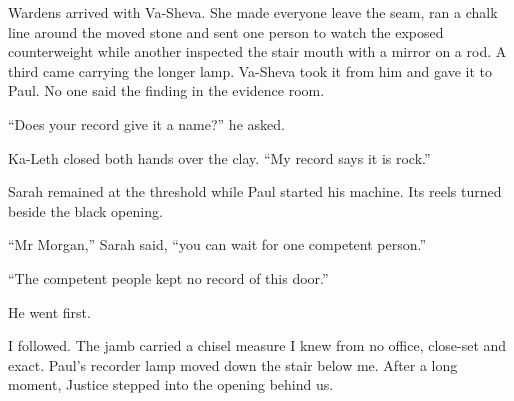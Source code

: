 Wardens arrived with Va-Sheva. She made everyone leave the seam, ran a chalk line around the moved stone and sent one person to watch the exposed counterweight while another inspected the stair mouth with a mirror on a rod. A third came carrying the longer lamp. Va-Sheva took it from him and gave it to Paul. No one said the finding in the evidence room.\par

``Does your record give it a name?'' he asked.\par

Ka-Leth closed both hands over the clay. ``My record says it is rock.''\par

Sarah remained at the threshold while Paul started his machine. Its reels turned beside the black opening.\par

``Mr Morgan,'' Sarah said, ``you can wait for one competent person.''\par

``The competent people kept no record of this door.''\par

He went first.\par

I followed. The jamb carried a chisel measure I knew from no office, close-set and exact. Paul's recorder lamp moved down the stair below me. After a long moment, Justice stepped into the opening behind us.\par
